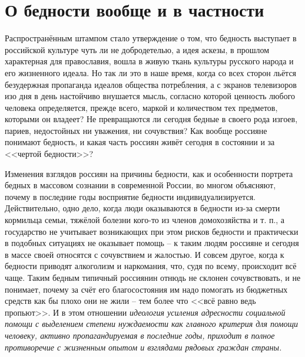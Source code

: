 \section{О бедности вообще и в частности}
Распространённым штампом стало утверждение о том, что бедность выступает в 
российской культуре чуть ли не добродетелью, а идея аскезы, в прошлом 
характерная для православия, вошла в живую ткань культуры русского народа и 
его жизненного идеала. Но так ли это в наше время, когда со всех сторон 
льётся безудержная пропаганда идеалов общества потребления, а с экранов 
телевизоров изо дня в день настойчиво внушается мысль, согласно которой 
ценность любого человека определяется, прежде всего, маркой и количеством 
тех предметов, которыми он владеет? Не превращаются ли сегодня бедные в своего 
рода изгоев, париев, недостойных ни уважения, ни сочувствия? Как вообще 
россияне понимают бедность, и какая часть россиян живёт сегодня в состоянии и 
за <<чертой бедности>>? 

Изменения взглядов россиян на причины бедности, как и особенности портрета 
бедных в массовом сознании в современной России, во многом объясняют, почему 
в последние годы восприятие бедности индивидуализируется. Действительно, одно 
дело, когда люди оказываются в бедности из-за смерти кормильца семьи, тяжёлой 
болезни кого-то из членов домохозяйства и т. п., а государство не учитывает 
возникающих при этом рисков бедности и практически в подобных ситуациях не 
оказывает помощь -- к таким людям россияне и сегодня в массе своей относятся 
с сочувствием и жалостью. И совсем другое, когда к бедности приводят 
алкоголизм и наркомания, что, судя по всему, происходит всё чаще. Таким бедным 
типичный россиянин отнюдь не склонен сочувствовать, и не понимает, почему за 
счёт его благосостояния им надо помогать из бюджетных средств как бы плохо 
они не жили -- тем более что <<всё равно ведь пропьют>>. И в этом отношении 
\emph{идеология усиления адресности социальной помощи с выделением степени 
нуждаемости как главного критерия для помощи человеку, активно 
пропагандируемая в последние годы, приходит в полное противоречие с жизненным 
опытом и взглядами рядовых граждан страны.}

